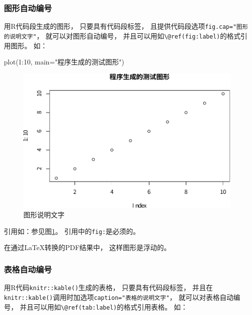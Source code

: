 \documentclass[
]{article}
\newenvironment{Shaded}{\begin{snugshade}}{\end{snugshade}}
\newcommand{\AttributeTok}[1]{\textcolor[rgb]{0.77,0.63,0.00}{#1}}
\newcommand{\DecValTok}[1]{\textcolor[rgb]{0.00,0.00,0.81}{#1}}
\newcommand{\FunctionTok}[1]{\textcolor[rgb]{0.00,0.00,0.00}{#1}}
\newcommand{\NormalTok}[1]{#1}
\newcommand{\SpecialCharTok}[1]{\textcolor[rgb]{0.00,0.00,0.00}{#1}}
\newcommand{\StringTok}[1]{\textcolor[rgb]{0.31,0.60,0.02}{#1}}
\begin{document}
\hypertarget{usage-writing-fig}{%
\subsubsection{图形自动编号}\label{usage-writing-fig}}

用R代码段生成的图形，
只要具有代码段标签，
且提供代码段选项\texttt{fig.cap="图形的说明文字"}，
就可以对图形自动编号，
并且可以用如\texttt{\textbackslash{}@ref(fig:label)}的格式引用图形。
如：

\begin{Shaded}
\begin{Highlighting}[]
\FunctionTok{plot}\NormalTok{(}\DecValTok{1}\SpecialCharTok{:}\DecValTok{10}\NormalTok{, }\AttributeTok{main=}\StringTok{"程序生成的测试图形"}\NormalTok{)}
\end{Highlighting}
\end{Shaded}

\begin{figure}
\centering
\includegraphics{0101-usage_files/figure-latex/u-w-f-ex01-1.pdf}
\caption{\label{fig:u-w-f-ex01}图形说明文字}
\end{figure}

引用如：参见图\ref{fig:u-w-f-ex01}。
引用中的\texttt{fig:}是必须的。

在通过LaTeX转换的PDF结果中，
这样图形是浮动的。

\hypertarget{usage-writing-tab}{%
\subsubsection{表格自动编号}\label{usage-writing-tab}}

用R代码\texttt{knitr::kable()}生成的表格，
只要具有代码段标签，
并且在\texttt{knitr::kable()}调用时加选项\texttt{caption="表格的说明文字"}，
就可以对表格自动编号，
并且可以用如\texttt{\textbackslash{}@ref(tab:label)}的格式引用表格。
如：
\end{document}
